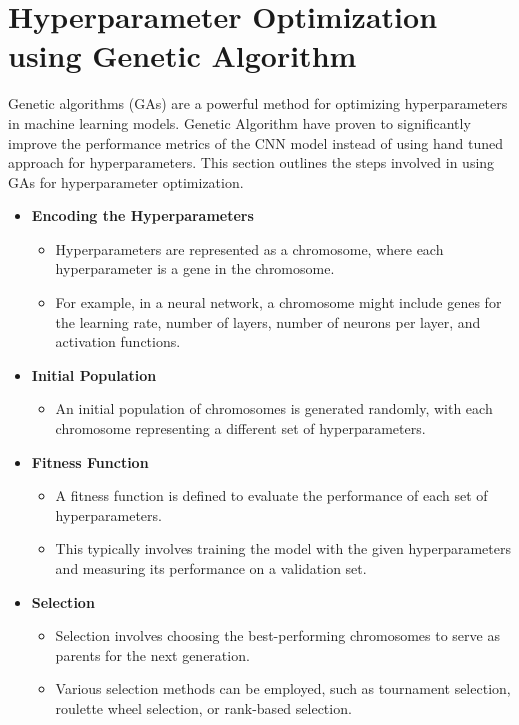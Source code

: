 \section{Hyperparameter Optimization using Genetic Algorithm}
Genetic algorithms (GAs) are a powerful method for optimizing hyperparameters in machine learning models. Genetic Algorithm have proven to significantly improve the performance metrics of the CNN model instead of using hand tuned approach for hyperparameters. This section outlines the steps involved in using GAs for hyperparameter optimization\cite{9058307}.
\begin{itemize}
    \item \textbf{Encoding the Hyperparameters}
    \begin{itemize}
        \item Hyperparameters are represented as a chromosome, where each hyperparameter is a gene in the chromosome.
        \item For example, in a neural network, a chromosome might include genes for the learning rate, number of layers, number of neurons per layer, and activation functions.
    \end{itemize}


    \item \textbf{Initial Population}
    \begin{itemize}
        \item An initial population of chromosomes is generated randomly, with each chromosome representing a different set of hyperparameters.
    \end{itemize}

    \item \textbf{Fitness Function}
    \begin{itemize}
        \item A fitness function is defined to evaluate the performance of each set of hyperparameters.
        \item This typically involves training the model with the given hyperparameters and measuring its performance on a validation set.
    \end{itemize}

    \item \textbf{Selection}
    \begin{itemize}
        \item Selection involves choosing the best-performing chromosomes to serve as parents for the next generation.
        \item Various selection methods can be employed, such as tournament selection, roulette wheel selection, or rank-based selection.
    \end{itemize}


\end{itemize}
